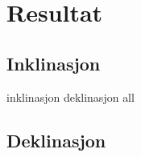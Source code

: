 \section{Resultat}
\subsection{Inklinasjon}

{inklinasjon}
{deklinasjon}
{all}

\subsection{Deklinasjon}